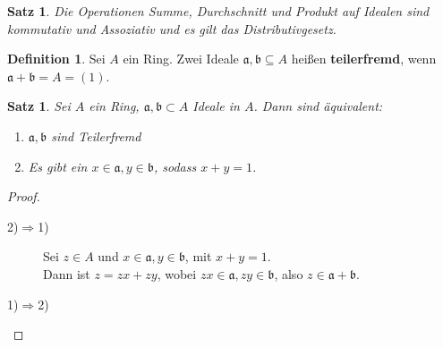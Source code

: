 \documentclass[10pt,a4paper]{article}
\theoremstyle{plain}
\newtheorem{satz}[theorem]{Satz}
\theoremstyle{definition}
\newtheorem{definition}[theorem]{Definition}
\theoremstyle{remark}
\begin{document}
	\begin{satz}
		Die Operationen Summe, Durchschnitt und Produkt auf Idealen sind kommutativ und Assoziativ und es gilt das Distributivgesetz.
	\end{satz}

	\begin{definition}
		Sei $A$ ein Ring. Zwei Ideale $\mathfrak a,\mathfrak b\subseteq A$ heißen \textbf{teilerfremd}, wenn $\mathfrak a+\mathfrak b=A=(1)$.
	\end{definition}

	\begin{satz}
		Sei $A$ ein Ring, $\mathfrak a,\mathfrak b\subset A$ Ideale in $A$. Dann sind äquivalent:
		\begin{enumerate}
			\item $\mathfrak a,\mathfrak b$ sind Teilerfremd
			\item Es gibt ein $x\in\mathfrak a,y\in\mathfrak b$, sodass $x+y=1$.
		\end{enumerate}
	\end{satz}
	\begin{proof}
		\begin{description}
			\item[2)$\Rightarrow$1)] Sei $z\in A$ und $x\in\mathfrak a,y\in\mathfrak b$, mit $x+y=1$.\\
			Dann ist $z=zx+zy$, wobei $zx\in\mathfrak a,zy\in\mathfrak b$, also $z\in\mathfrak a+\mathfrak b$.
			\item[1)$\Rightarrow$2)] 
		\end{description}
	\end{proof}
	
\end{document}
